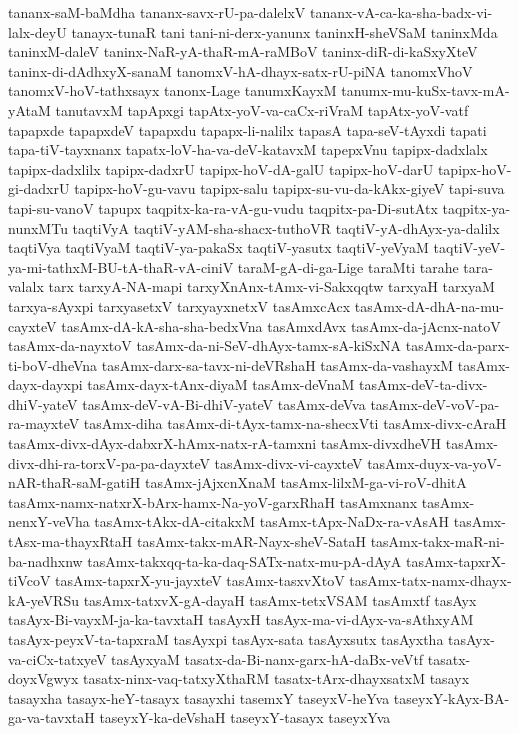 {tananx-saM-baMdha
tananx-savx-rU-pa-dalelxV
tananx-vA-ca-ka-sha-badx-vi-lalx-deyU
tanayx-tunaR
tani
tani-ni-derx-yanunx
taninxH-sheVSaM
taninxMda
taninxM-daleV
taninx-NaR-yA-thaR-mA-raMBoV
taninx-diR-di-kaSxyXteV
taninx-di-dAdhxyX-sanaM
tanomxV-hA-dhayx-satx-rU-piNA
tanomxVhoV
tanomxV-hoV-tathxsayx
tanonx-Lage
tanumxKayxM
tanumx-mu-kuSx-tavx-mA-yAtaM
tanutavxM
tapApxgi
tapAtx-yoV-va-caCx-riVraM
tapAtx-yoV-vatf
tapapxde
tapapxdeV
tapapxdu
tapapx-li-nalilx
tapasA
tapa-seV-tAyxdi
tapati
tapa-tiV-tayxnanx
tapatx-loV-ha-va-deV-katavxM
tapepxVnu
tapipx-dadxlalx
tapipx-dadxlilx
tapipx-dadxrU
tapipx-hoV-dA-galU
tapipx-hoV-darU
tapipx-hoV-gi-dadxrU
tapipx-hoV-gu-vavu
tapipx-salu
tapipx-su-vu-da-kAkx-giyeV
tapi-suva
tapi-su-vanoV
tapupx
taqpitx-ka-ra-vA-gu-vudu
taqpitx-pa-Di-sutAtx
taqpitx-ya-nunxMTu
taqtiVyA
taqtiV-yAM-sha-shacx-tuthoVR
taqtiV-yA-dhAyx-ya-dalilx
taqtiVya
taqtiVyaM
taqtiV-ya-pakaSx
taqtiV-yasutx
taqtiV-yeVyaM
taqtiV-yeV-ya-mi-tathxM-BU-tA-thaR-vA-ciniV
taraM-gA-di-ga-Lige
taraMti
tarahe
tara-valalx
tarx
tarxyA-NA-mapi
tarxyXnAnx-tAmx-vi-Sakxqqtw
tarxyaH
tarxyaM
tarxya-sAyxpi
tarxyasetxV
tarxyayxnetxV
tasAmxcAcx
tasAmx-dA-dhA-na-mu-cayxteV
tasAmx-dA-kA-sha-sha-bedxVna
tasAmxdAvx
tasAmx-da-jAcnx-natoV
tasAmx-da-nayxtoV
tasAmx-da-ni-SeV-dhAyx-tamx-sA-kiSxNA
tasAmx-da-parx-ti-boV-dheVna
tasAmx-darx-sa-tavx-ni-deVRshaH
tasAmx-da-vashayxM
tasAmx-dayx-dayxpi
tasAmx-dayx-tAnx-diyaM
tasAmx-deVnaM
tasAmx-deV-ta-divx-dhiV-yateV
tasAmx-deV-vA-Bi-dhiV-yateV
tasAmx-deVva
tasAmx-deV-voV-pa-ra-mayxteV
tasAmx-diha
tasAmx-di-tAyx-tamx-na-shecxVti
tasAmx-divx-cAraH
tasAmx-divx-dAyx-dabxrX-hAmx-natx-rA-tamxni
tasAmx-divxdheVH
tasAmx-divx-dhi-ra-torxV-pa-pa-dayxteV
tasAmx-divx-vi-cayxteV
tasAmx-duyx-va-yoV-nAR-thaR-saM-gatiH
tasAmx-jAjxcnXnaM
tasAmx-lilxM-ga-vi-roV-dhitA
tasAmx-namx-natxrX-bArx-hamx-Na-yoV-garxRhaH
tasAmxnanx
tasAmx-nenxY-veVha
tasAmx-tAkx-dA-citakxM
tasAmx-tApx-NaDx-ra-vAsAH
tasAmx-tAsx-ma-thayxRtaH
tasAmx-takx-mAR-Nayx-sheV-SataH
tasAmx-takx-maR-ni-ba-nadhxnw
tasAmx-takxqq-ta-ka-daq-SATx-natx-mu-pA-dAyA
tasAmx-tapxrX-tiVcoV
tasAmx-tapxrX-yu-jayxteV
tasAmx-tasxvXtoV
tasAmx-tatx-namx-dhayx-kA-yeVRSu
tasAmx-tatxvX-gA-dayaH
tasAmx-tetxVSAM
tasAmxtf
tasAyx
tasAyx-Bi-vayxM-ja-ka-tavxtaH
tasAyxH
tasAyx-ma-vi-dAyx-va-sAthxyAM
tasAyx-peyxV-ta-tapxraM
tasAyxpi
tasAyx-sata
tasAyxsutx
tasAyxtha
tasAyx-va-ciCx-tatxyeV
tasAyxyaM
tasatx-da-Bi-nanx-garx-hA-daBx-veVtf
tasatx-doyxVgwyx
tasatx-ninx-vaq-tatxyXthaRM
tasatx-tArx-dhayxsatxM
tasayx
tasayxha
tasayx-heY-tasayx
tasayxhi
tasemxY
taseyxV-heYva
taseyxY-kAyx-BA-ga-va-tavxtaH
taseyxY-ka-deVshaH
taseyxY-tasayx
taseyxYva
}
